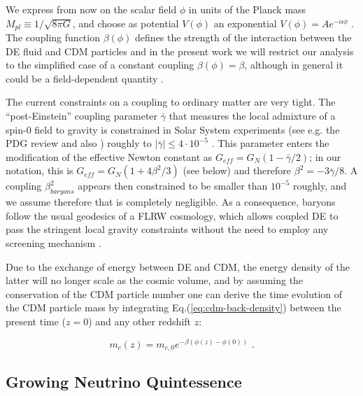 We express from now on the scalar field $\phi$ in units of the Planck
mass $M_{pl}\equiv1/\sqrt{8\pi G}$, and choose as potential $V(\phi)$
an exponential $V(\phi)=Ae^{-\alpha\phi}$ \citep{Lucchin_Matarrese_1984,Wetterich_1988}.
The coupling function $\beta(\phi)$ defines the strength of the interaction
between the DE fluid and CDM particles and in the present work we
will restrict our analysis to the simplified case of a constant coupling
$\beta(\phi)=\beta$, although in general it could be a field-dependent
quantity \cite{Amendola_2004,Baldi_2011a}.

The current constraints on a coupling to ordinary matter are very
tight. The ``post-Einstein'' coupling parameter $\bar{\gamma}$
that measures the local admixture of a spin-0 field to gravity is
constrained in Solar System experiments (see e.g. the PDG review \cite{Agashe:2014kda}
and also \citep{Will_2005,Bertotti_Iess_Tortora_2003}) roughly to
$|\bar{\gamma}|\le4\cdot10^{-5}$ . This parameter enters the modification
of the effective Newton constant as $G_{eff}=G_{N}(1-\bar{\gamma}/2)$;
in our notation, this is $G_{eff}=G_{N}(1+4\beta^{2}/3)$ (see below)
and therefore $\beta^{2}=-3\bar{\gamma}/8$. A coupling $\beta_{baryons}^{2}$
appears then constrained to be smaller than $10^{-5}$ roughly, and
we assume therefore that is completely negligible. As a consequence,
baryons follow the usual geodesics of a FLRW cosmology, which allows
coupled DE to pass the stringent local gravity constraints without
the need to employ any screening mechanism \citep{2015arXiv150203888H}.

Due to the exchange of energy between DE and CDM, the energy density
of the latter will no longer scale as the cosmic volume, and by assuming
the conservation of the CDM particle number one can derive the time
evolution of the CDM particle mass by integrating Eq.(\ref{eq:cdm-back-density})
between the present time ($z=0$) and any other redshift $z$:

\begin{equation}
m_{c}(z)=m_{c,0}e^{-\beta(\phi(z)-\phi(0))}\,\,.
\end{equation}


\subsection{Growing Neutrino Quintessence \label{sub:GNQ}}

